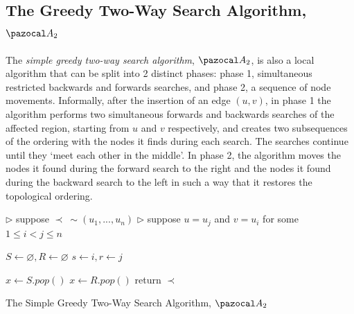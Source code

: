 \documentclass{report}
\begin{document}
\subsection{The Greedy Two-Way Search Algorithm, $\pazocal A_2$}

The \textit{simple greedy two-way search algorithm}, $\pazocal A_2$, is also a local algorithm that can be split into 2 distinct phases: phase 1, simultaneous restricted backwards and forwards searches, and phase 2, a sequence of node movements. Informally, after the insertion of an edge $(u,v)$, in phase 1 the algorithm performs two simultaneous forwards and backwards searches of the affected region, starting from $u$ and $v$ respectively, and creates two subsequences of the ordering with the nodes it finds during each search. The searches continue until they `meet each other in the middle'. In phase 2, the algorithm moves the nodes it found during the forward search to the right and the nodes it found during the backward search to the left in such a way that it restores the topological ordering.\newline

\begin{algorithm}[H]\label{twoway}
    \SetAlgoLined
    
    
    $\triangleright$ suppose $\prec \: \sim (u_1,...,u_n)$\;
    $\triangleright$ suppose $u = u_j$ and $v=u_i$ for some $1 \leq i < j \leq n$\;
    
    $S \leftarrow \varnothing, R \leftarrow \varnothing$\;
    $s \leftarrow i, r \leftarrow j$\;
    
    $x \leftarrow S.pop()$\;
    $x \leftarrow R.pop()$\;
    return $\prec$\;
    \caption{The Simple Greedy Two-Way Search Algorithm, $\pazocal A_2$}
\end{algorithm}
\end{document}

